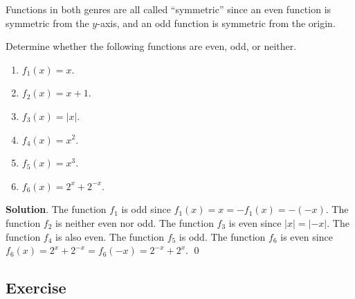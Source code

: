 \documentclass[11pt]{book}
\begin{document}
Functions in both genres are all called ``symmetric'' since an even function is symmetric from the $y$-axis, and an odd function is symmetric from the origin.

\begin{example}
    Determine whether the following functions are even, odd, or neither.
    \vspace{-1em}
    \begin{multicols}{3}
        \begin{enumerate}
            \item $f_1(x)=x$.
            \item $f_2(x)=x+1$.
            \item $f_3(x)=|x|$.
            \item $f_4(x)=x^2$.
            \item $f_5(x)=x^3$.
            \item $f_6(x)=2^x+2^{-x}$.
        \end{enumerate}
    \end{multicols}
    \vspace{0.1em}
\end{example}
\textbf{Solution}. The function $f_1$ is odd since $f_1(x)=x=-f_1(x)=-(-x)$. The function $f_2$ is neither even nor odd. The function $f_3$ is even since $|x|=|-x|$. The function $f_4$ is also even. The function $f_5$ is odd. The function $f_6$ is even since $f_6(x)=2^x+2^{-x}=f_6(-x)=2^{-x}+2^x$. \qed

\subsection*{Exercise}
\end{document}
